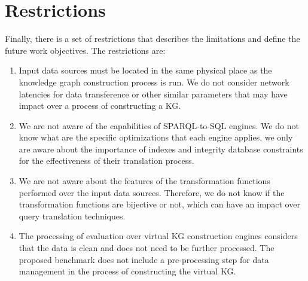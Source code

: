 \section{Restrictions}
Finally, there is a set of restrictions that describes the limitations and define the future work objectives. The restrictions are:

\begin{enumerate}[label=\textbf{R{\arabic*}}]
    \item Input data sources must be located in the same physical place as the knowledge graph construction process is run. We do not consider network latencies for data transference or other similar parameters that may have impact over a process of constructing a KG. 
    \item We are not aware of the capabilities of SPARQL-to-SQL engines. We do not know what are the specific optimizations that each engine applies, we only are aware about the importance of indexes and integrity database constraints for the effectiveness of their translation process.
    \item We are not aware about the features of the transformation functions performed over the input data sources. Therefore, we do not know if the transformation functions are bijective or not, which can have an impact over query translation techniques.  
    \item The processing of evaluation over virtual KG construction engines considers that the data is clean and does not need to be further processed. The proposed benchmark does not include a pre-processing step for data management in the process of constructing the virtual KG.
\end{enumerate}
